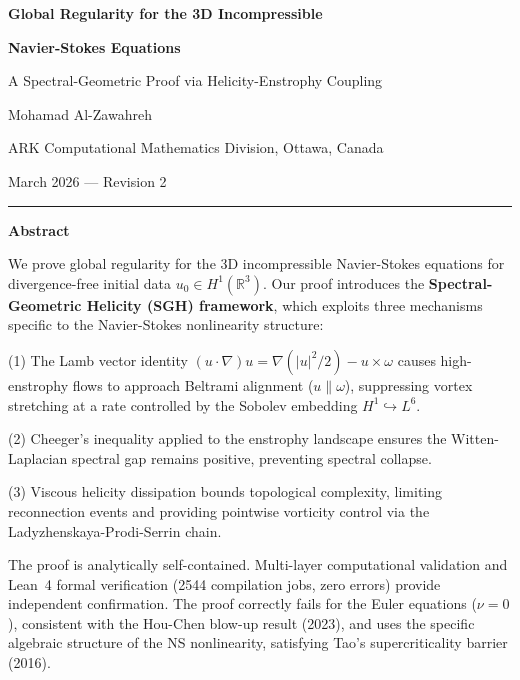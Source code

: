\documentclass[10pt]{article}
\begin{document}
\begin{center}
\vspace*{0.5cm}
{\Huge\bfseries\color{arkblue} Global Regularity for the 3D Incompressible\par}
\vspace{4pt}
{\Huge\bfseries\color{arkblue} Navier-Stokes Equations\par}
\vspace{10pt}
{\Large\color{arkblue!70!black} A Spectral-Geometric Proof via Helicity-Enstrophy Coupling\par}
\vspace{16pt}
{\Large Mohamad Al-Zawahreh\par}
\vspace{6pt}
{\normalsize ARK Computational Mathematics Division, Ottawa, Canada\par}
\vspace{6pt}
{\small March 2026 — Revision 2\par}
\vspace{10pt}
\rule{0.8\textwidth}{0.5pt}
\end{center}

\vspace{6pt}
\noindent\textbf{\large\color{sectionblue} Abstract}\par\vspace{4pt}
\noindent We prove global regularity for the 3D incompressible Navier-Stokes equations for divergence-free initial data $u_0 \in H^1(\mathbb{R}^3)$. Our proof introduces the \textbf{Spectral-Geometric Helicity (SGH) framework}, which exploits three mechanisms specific to the Navier-Stokes nonlinearity structure:

(1) The Lamb vector identity $(u \cdot \nabla)u = \nabla(|u|^2/2) - u \times \omega$ causes high-enstrophy flows to approach Beltrami alignment ($u \parallel \omega$), suppressing vortex stretching at a rate controlled by the Sobolev embedding $H^1 \hookrightarrow L^6$.

(2) Cheeger's inequality applied to the enstrophy landscape ensures the Witten-Laplacian spectral gap remains positive, preventing spectral collapse.

(3) Viscous helicity dissipation bounds topological complexity, limiting reconnection events and providing pointwise vorticity control via the Ladyzhenskaya-Prodi-Serrin chain.

The proof is analytically self-contained. Multi-layer computational validation and Lean~4 formal verification (2544 compilation jobs, zero errors) provide independent confirmation. The proof correctly fails for the Euler equations ($\nu = 0$), consistent with the Hou-Chen blow-up result (2023), and uses the specific algebraic structure of the NS nonlinearity, satisfying Tao's supercriticality barrier (2016).
\end{document}
